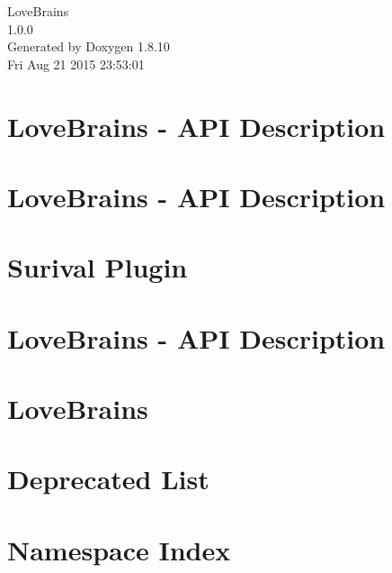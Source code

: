 \documentclass[twoside]{book}
\newcommand{\+}{\discretionary{\mbox{\scriptsize$\hookleftarrow$}}{}{}}
\newcommand{\clearemptydoublepage}{%
  \newpage{\pagestyle{empty}\cleardoublepage}%
}
\begin{document}
\begin{titlepage}
\vspace*{7cm}
\begin{center}%
{\Large Love\+Brains \\[1ex]\large 1.\+0.\+0 }\\
\vspace*{1cm}
{\large Generated by Doxygen 1.8.10}\\
\vspace*{0.5cm}
{\small Fri Aug 21 2015 23:53:01}\\
\end{center}
\end{titlepage}
\clearemptydoublepage
\tableofcontents
\clearemptydoublepage
{}

\chapter{Love\+Brains -\/ A\+P\+I Description}
\label{md_api__r_e_a_d_m_e}

\chapter{Love\+Brains -\/ A\+P\+I Description}
\label{md_mods_basic_survival_api__r_e_a_d_m_e}

\chapter{Surival Plugin}
\label{md_mods_basic_survival__r_e_a_d_m_e}

\chapter{Love\+Brains -\/ A\+P\+I Description}
\label{md_mods_example_api__r_e_a_d_m_e}

\chapter{Love\+Brains}
\label{md__r_e_a_d_m_e}

\chapter{Deprecated List}
\label{deprecated}

\chapter{Namespace Index}

\end{document}
